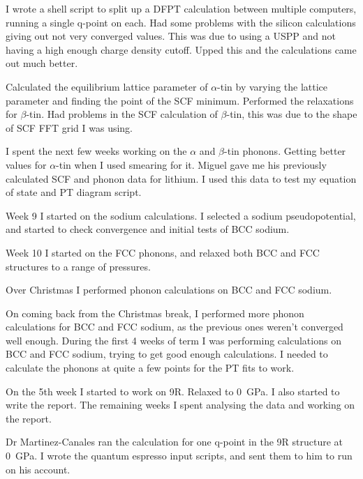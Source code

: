 \documentclass[12pt]{article}
\begin{document}
I wrote a shell script to split up a DFPT calculation between multiple computers, running a single q-point on each. Had some problems with the silicon calculations giving out not very converged values. This was due to using a USPP and not having a high enough charge density cutoff. Upped this and the calculations came out much better.

Calculated the equilibrium lattice parameter of $\alpha$-tin by varying the lattice parameter and finding the point of the SCF minimum. Performed the relaxations for $\beta$-tin. 
Had problems in the SCF calculation of $\beta$-tin, this was due to the shape of SCF FFT grid I was using. 

I spent the next few weeks working on the $\alpha$ and $\beta$-tin phonons. Getting better values for $\alpha$-tin when I used smearing for it.
Miguel gave me his previously calculated SCF and phonon data for lithium. I used this data to test my equation of state and PT diagram script.

Week 9 I started on the sodium calculations. I selected a sodium pseudopotential, and started to check convergence and initial tests of BCC sodium. 

Week 10 I started on the FCC phonons, and relaxed both BCC and FCC structures to a range of pressures.

Over Christmas I performed phonon calculations on BCC and FCC sodium.

On coming back from the Christmas break, I performed more phonon calculations for BCC and FCC sodium, as the previous ones weren't converged well enough.
During the first 4 weeks of term I was performing calculations on BCC and FCC sodium, trying to get good enough calculations. 
I needed to calculate the phonons at quite a few points for the PT fits to work.

On the 5th week I started to work on 9R. Relaxed to \SI{0}{\giga\pascal}. I also started to write the report. 
The remaining weeks I spent analysing the data and working on the report.
\acknowledgments

Dr Martinez-Canales ran the calculation for one q-point in the 9R structure at \SI{0}{\giga\pascal}. I wrote the quantum espresso input scripts, and sent them to him to run on his account.
\maintext
\end{document}
